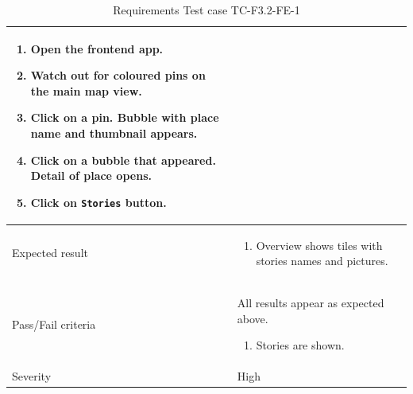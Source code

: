 \documentclass[11pt]{book}
\begin{document}
\begin{table}
\begin{tabular}{| p{3cm} | p{9.5cm} |}
                            \begin{enumerate}
                              \item Open the frontend app.
                              \item Watch out for coloured pins on the main map view.
                              \item Click on a pin. Bubble with place name and thumbnail appears.
                              \item Click on a bubble that appeared. Detail of place opens.
                              \item Click on \texttt{Stories} button.
                            \end{enumerate} \\ \hline 
    Expected result       & \begin{enumerate}
                              \item Overview shows tiles with stories names and pictures.
                            \end{enumerate} \\ \hline 
    Pass/Fail criteria    & All results appear as expected above.
                            \begin{enumerate}
                              \item Stories are shown.
                            \end{enumerate} \\ \hline 
    Severity              & High \\ \hline 
  \end{tabular}
  \caption{Requirements Test case TC-F3.2-FE-1}
  \label{tab:TCF3.2FE1}
\end{table}
\end{document}
